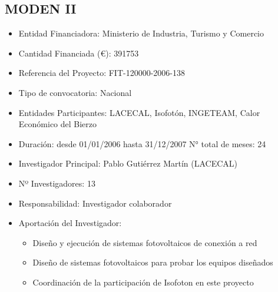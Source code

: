 \documentclass[article, a4paper]{memoir}
\begin{document}
\subsection{MODEN II}
\label{sec-8-9}

\begin{itemize}
\item Entidad Financiadora: Ministerio de Industria, Turismo y Comercio
\item Cantidad Financiada (€): 391753
\item Referencia del Proyecto: FIT-120000-2006-138
\item Tipo de convocatoria: Nacional
\item Entidades Participantes: LACECAL, Isofotón, INGETEAM, Calor Económico del Bierzo
\item Duración: desde 01/01/2006 hasta 31/12/2007 N° total de meses: 24
\item Investigador Principal: Pablo Gutiérrez Martín (LACECAL)
\item Nº Investigadores: 13
\item Responsabilidad: Investigador colaborador
\item Aportación del Investigador:
\begin{itemize}
\item Diseño y ejecución de sistemas fotovoltaicos de conexión a red
\item Diseño de sistemas fotovoltaicos para probar los equipos diseñados
\item Coordinación de la participación de Isofoton en este proyecto
\end{itemize}
\end{itemize}
\end{document}
